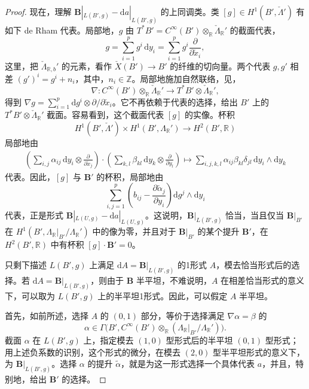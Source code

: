 \begin{proof}
现在，理解 $\mathbf B|_{L(B',g)}-\mathrm da|_{L(B',g)}$ 的上同调类。类 $[g]\in H^1(B',\check\Lambda')$ 有如下 de Rham 代表。局部地，$g$ 由 $T^*B'=C^\infty(B')\otimes_{\mathbb R}\check\Lambda_{\mathbb R}'$ 的截面代表，
\[
g=\sum_{i=1}^pg^i\,\mathrm dy_i
=\sum_{i=1}^pg^i\frac{\partial}{\partial\check x_i},
\]
这里，把 $\check\Lambda_{\mathbb R,b}'$ 的元素，看作 $\check X(B')\to B'$ 的纤维的切向量。两个代表 $g,g'$ 相差 $(g')^i=g^i+n_i$，其中，$n_i\in\mathbb Z$。局部地施加自然联络，见，
\[
\nabla\colon C^\infty(B')\otimes_{\mathbb R}\check\Lambda_{\mathbb R}'
\longrightarrow T^*B'\otimes\check\Lambda_{\mathbb R}',
\]
得到 $\nabla g=\sum_{i=1}^p\mathrm dg^i\otimes\partial/\partial\check x_i$。它不再依赖于代表的选择，给出 $B'$ 上的 $T^*B'\otimes\check\Lambda_{\mathbb R}'$ 截面。容易看到，这个截面代表 $[g]$ 的实像。杯积
\[
H^1(B',\check\Lambda')\times H^1(B',\Lambda_{\mathbb R}')
\longrightarrow H^2(B',\mathbb R)
\]
局部地由
\[
\begin{aligned}
\left(\sum_{i,j}\alpha_{ij}\,\mathrm dy_i\otimes
\frac{\partial}{\partial\check x_j}\right)
\cdot\left(\sum_{k,l}\beta_{kl}\,\mathrm dy_k\otimes
\frac{\partial}{\partial y_l}\right)
\longmapsto\sum_{i,j,k,l}\alpha_{ij}\beta_{kl}\delta_{jl}\,
\mathrm dy_i\wedge\mathrm dy_k
\end{aligned}
\]
代表。因此，$[g]$ 与 $\mathbf B'$ 的杯积，局部地由
\[
\sum_{i,j=1}^p
\left(b_{ij}-\frac{\partial\widetilde\alpha_j}{\partial y_i}\right)
\mathrm dg^j\wedge\mathrm dy_i
\]
代表，正是形式 $\mathbf B|_{L(U,g)}-\mathrm da|_{L(U,g)}$。这说明，$\mathbf B|_{L(B',g)}$ 恰当，当且仅当 $\mathbf B|_{B'}$ 在 $H^1(B',\Lambda_{\mathbb R}|_{B'}/\Lambda_{\mathbb R}')$ 中的像为零，并且对于 $\mathbf B|_{B'}$ 的某个提升 $\mathbf B'$，在 $H^2(B',\mathbb R)$ 中有杯积 $[g]\cdot\mathbf B'=0$。

只剩下描述 $L(B',g)$ 上满足 $\mathrm dA=\mathbf B|_{L(B',g)}$ 的1形式 $A$，模去恰当形式后的选择。若 $\mathrm dA=\mathbf B|_{L(B',g)}$，则由于 $\mathbf B$ 半平坦，不难说明，$A$ 在相差恰当形式的意义下，可以取为 $L(B',g)$ 上的半平坦1形式。因此，可以假定 $A$ 半平坦。

首先，如前所述，选择 $A$ 的 $(0,1)$ 部分，等价于选择满足 $\nabla\alpha=\beta$ 的
\[
\alpha\in\Gamma\bigl(B',C^\infty(B')\otimes_{\mathbb R}
(\Lambda_{\mathbb R}|_{B'}/\Lambda_{\mathbb R}')\bigr).
\]
截面 $\alpha$ 在 $L(B',g)$ 上，指定模去 $(1,0)$ 型形式后的半平坦 $(0,1)$ 型形式；用上述负系数的识别，这个形式的微分，在模去 $(2,0)$ 型半平坦形式的意义下，为 $\mathbf B|_{L(B',g)}$。选择 $\alpha$ 的提升 $\widetilde\alpha$，就是为这一形式选择一个具体代表 $a$，并且，特别地，给出 $\mathbf B'$ 的选择。


\end{proof}
